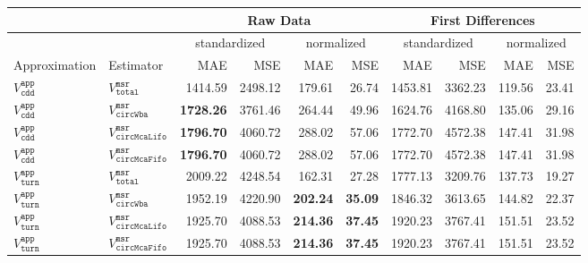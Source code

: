 \begin{tabular}{llrrrrrrrr}
   \hline \multicolumn{2}{l}{ } & \multicolumn{4}{c}{Raw Data} & \multicolumn{4}{c}{First Differences} \\\hline \multicolumn{2}{l}{ } & \multicolumn{2}{c}{standardized} & \multicolumn{2}{c}{normalized} & \multicolumn{2}{c}{standardized} & \multicolumn{2}{c}{normalized} \\ \hline
Approximation & Estimator & MAE & MSE & MAE & MSE & MAE & MSE & MAE & MSE \\ 
   \hline
$V^{\mathtt{app}}_{\mathtt{cdd}}$ & $V^{\mathtt{msr}}_{\mathtt{total}}$         & 1414.59          & 2498.12          & 179.61 &          26.74         & 1453.81          & 3362.23         & 119.56        & 23.41 \\ 
  $V^{\mathtt{app}}_{\mathtt{cdd}}$ & $V^{\mathtt{msr}}_{\mathtt{circWba}}$     & \textbf{1728.26} & 3761.46          & 264.44 &          49.96         & 1624.76          & 4168.80         & 135.06        & 29.16 \\ 
  $V^{\mathtt{app}}_{\mathtt{cdd}}$ & $V^{\mathtt{msr}}_{\mathtt{circMcaLifo}}$ & \textbf{1796.70} & 4060.72          & 288.02 &          57.06         & 1772.70          & 4572.38         & 147.41        & 31.98 \\ 
  $V^{\mathtt{app}}_{\mathtt{cdd}}$ & $V^{\mathtt{msr}}_{\mathtt{circMcaFifo}}$ & \textbf{1796.70} & 4060.72          & 288.02 &          57.06         & 1772.70          & 4572.38         & 147.41        & 31.98 \\ 
   \hline
$V^{\mathtt{app}}_{\mathtt{turn}}$ & $V^{\mathtt{msr}}_{\mathtt{total}}$       & 2009.22          & 4248.54          & 162.31 &          27.28         & 1777.13          & 3209.76         & 137.73        & 19.27 \\ 
  $V^{\mathtt{app}}_{\mathtt{turn}}$ & $V^{\mathtt{msr}}_{\mathtt{circWba}}$    & 1952.19          & 4220.90          & \textbf{202.24} & \textbf{35.09} & 1846.32          & 3613.65         & 144.82        & 22.37 \\ 
  $V^{\mathtt{app}}_{\mathtt{turn}}$ & $V^{\mathtt{msr}}_{\mathtt{circMcaLifo}}$ & 1925.70          & 4088.53          & \textbf{214.36} & \textbf{37.45} & 1920.23          & 3767.41         & 151.51        & 23.52 \\ 
  $V^{\mathtt{app}}_{\mathtt{turn}}$ & $V^{\mathtt{msr}}_{\mathtt{circMcaFifo}}$ & 1925.70          & 4088.53          & \textbf{214.36} & \textbf{37.45} & 1920.23          & 3767.41         & 151.51        & 23.52 \\ 

\end{tabular}
